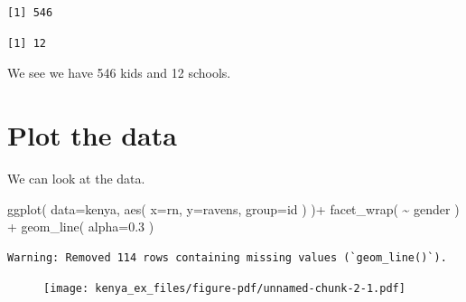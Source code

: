 \documentclass[
  letterpaper,
  DIV=11,
  numbers=noendperiod]{scrreprt}
\newenvironment{Shaded}{\begin{snugshade}}{\end{snugshade}}
\newcommand{\AttributeTok}[1]{\textcolor[rgb]{0.49,0.56,0.16}{#1}}
\newcommand{\FloatTok}[1]{\textcolor[rgb]{0.25,0.63,0.44}{#1}}
\newcommand{\FunctionTok}[1]{\textcolor[rgb]{0.02,0.16,0.49}{#1}}
\newcommand{\NormalTok}[1]{\textcolor[rgb]{0.00,0.44,0.13}{#1}}
\newcommand{\SpecialCharTok}[1]{\textcolor[rgb]{0.25,0.44,0.63}{#1}}
\begin{document}
\begin{Shaded}
\end{Shaded}

\begin{verbatim}
[1] 546
\end{verbatim}

\begin{Shaded}
\end{Shaded}

\begin{verbatim}
[1] 12
\end{verbatim}

We see we have 546 kids and 12 schools.

\hypertarget{plot-the-data-1}{%
\section{Plot the data}\label{plot-the-data-1}}

We can look at the data.

\begin{Shaded}
\begin{Highlighting}[]
\FunctionTok{ggplot}\NormalTok{( }\AttributeTok{data=}\NormalTok{kenya, }\FunctionTok{aes}\NormalTok{( }\AttributeTok{x=}\NormalTok{rn, }\AttributeTok{y=}\NormalTok{ravens, }\AttributeTok{group=}\NormalTok{id )  )}\SpecialCharTok{+} 
            \FunctionTok{facet\_wrap}\NormalTok{( }\SpecialCharTok{\textasciitilde{}}\NormalTok{ gender ) }\SpecialCharTok{+} 
            \FunctionTok{geom\_line}\NormalTok{( }\AttributeTok{alpha=}\FloatTok{0.3}\NormalTok{ )}
\end{Highlighting}
\end{Shaded}

\begin{verbatim}
Warning: Removed 114 rows containing missing values (`geom_line()`).
\end{verbatim}

\begin{figure}[H]

{\centering \texttt{[image: kenya\_ex\_files/figure-pdf/unnamed-chunk-2-1.pdf]}

}

\end{figure}
\end{document}
